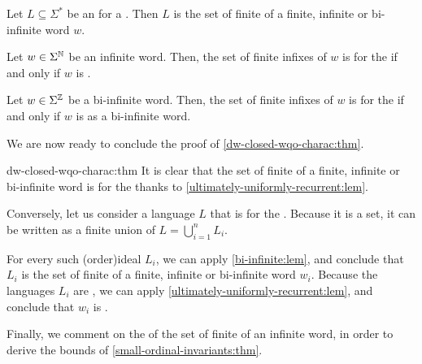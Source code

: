 \begin{lemma}
    \label{bi-infinite:lem}
    Let $L \subseteq \Sigma^*$ be an  
    for a  
    . Then $L$ is the set of finite 
    of a finite, infinite or bi-infinite word $w$.
\end{lemma}

\begin{lemma}
    \label{ultimately-uniformly-recurrent:lem}
    Let $w \in \Sigma^{\mathbb{N}}$ be an infinite word. 
    Then, the set of finite infixes of $w$ is  for the 
    if and only if $w$ is .
\end{lemma}

\begin{lemma}
  \label{bi-infinite-uur:lem}
    Let $w \in \Sigma^{\mathbb{Z}}$ be a bi-infinite word. Then, the set of finite
    infixes of $w$ is  for the  if
    and only if $w$ is  as a bi-infinite word.
\end{lemma}

We are now ready to conclude the proof of \cref{dw-closed-wqo-charac:thm}.

\begin{proofof}{dw-closed-wqo-charac:thm}
  It is clear that the set of finite  of a finite, infinite or
  bi-infinite  word is 
  for the  thanks to \cref{ultimately-uniformly-recurrent:lem}.

  Conversely, let us consider a  language $L$ that is
   for the . Because it is a
   set, it can be written as a finite union of  $L = \bigcup_{i = 1}^n L_i$.

  For every such \kl(order){ideal} $L_i$, we can apply
  \cref{bi-infinite:lem}, and conclude that $L_i$ is the set of finite
   of a finite, infinite or bi-infinite word $w_i$. 
  Because the languages $L_i$ are , we can apply
  \cref{ultimately-uniformly-recurrent:lem}, and conclude that $w_i$ is
  .
\end{proofof}

Finally, we comment on the  of the set of finite
 of an  infinite word, in order
to derive the bounds of \cref{small-ordinal-invariants:thm}.

